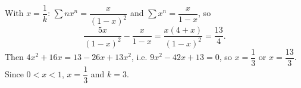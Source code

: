 With $x=\dfrac1k$: $\sum nx^n=\dfrac x{(1-x)^2}$ and $\sum x^n=\dfrac x{1-x}$, so
\[\dfrac{5x}{(1-x)^2}-\dfrac x{1-x}=\dfrac{x(4+x)}{(1-x)^2}=\dfrac{13}4.\]
Then $4x^2+16x=13-26x+13x^2$, i.e. $9x^2-42x+13=0$, so $x=\dfrac13$ or $x=\dfrac{13}3$. Since $0<x<1$, $x=\dfrac13$ and $k=\boxed{3}$.

